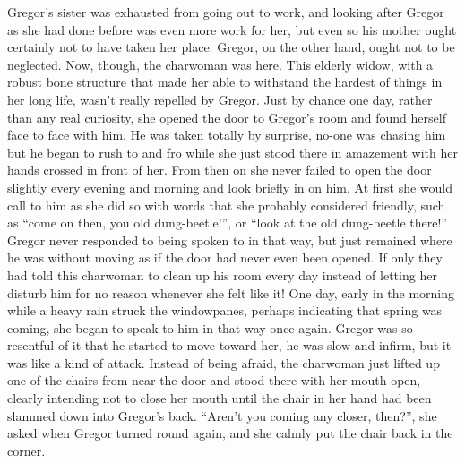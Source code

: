 Gregor’s sister was exhausted from going out to work, and looking after
Gregor as she had done before was even more work for her, but even so
his mother ought certainly not to have taken her place. Gregor, on the
other hand, ought not to be neglected. Now, though, the charwoman was
here. This elderly widow, with a robust bone structure that made her
able to withstand the hardest of things in her long life, wasn’t really
repelled by Gregor. Just by chance one day, rather than any real
curiosity, she opened the door to Gregor’s room and found herself face
to face with him. He was taken totally by surprise, no-one was chasing
him but he began to rush to and fro while she just stood there in
amazement with her hands crossed in front of her. From then on she
never failed to open the door slightly every evening and morning and
look briefly in on him. At first she would call to him as she did so
with words that she probably considered friendly, such as “come on
then, you old dung-beetle!”, or “look at the old dung-beetle there!”
Gregor never responded to being spoken to in that way, but just
remained where he was without moving as if the door had never even been
opened. If only they had told this charwoman to clean up his room every
day instead of letting her disturb him for no reason whenever she felt
like it! One day, early in the morning while a heavy rain struck the
windowpanes, perhaps indicating that spring was coming, she began to
speak to him in that way once again. Gregor was so resentful of it that
he started to move toward her, he was slow and infirm, but it was like
a kind of attack. Instead of being afraid, the charwoman just lifted up
one of the chairs from near the door and stood there with her mouth
open, clearly intending not to close her mouth until the chair in her
hand had been slammed down into Gregor’s back. “Aren’t you coming any
closer, then?”, she asked when Gregor turned round again, and she
calmly put the chair back in the corner.

